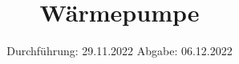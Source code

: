 
\usepackage{pgfplotstable}
\usepackage{caption}



\subject{V206}
\title{Wärmepumpe}
\date{%
  Durchführung: 29.11.2022
  \hspace{3em}
  Abgabe: 06.12.2022
}


\setlength{\parindent}{0pt} %

\maketitle
\thispagestyle{empty}
\tableofcontents
\newpage






\nocite{*}
\printbibliography{}


